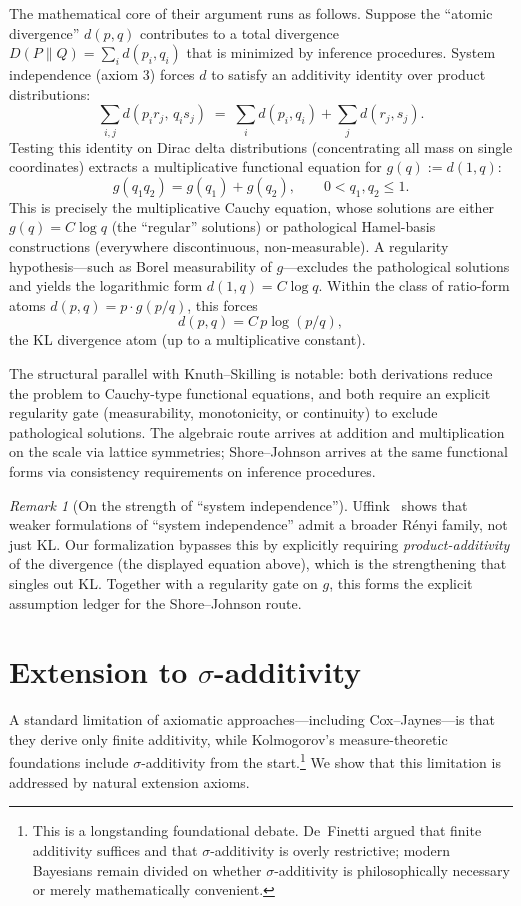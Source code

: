 \documentclass[11pt]{article}
\theoremstyle{definition}
\theoremstyle{remark}
\newtheorem{remark}[theorem]{Remark}
\begin{document}
The mathematical core of their argument runs as follows.  Suppose the ``atomic divergence''
$d(p,q)$ contributes to a total divergence $D(P\|Q)=\sum_i d(p_i,q_i)$ that is minimized by
inference procedures.  System independence (axiom 3) forces $d$ to satisfy an additivity identity
over product distributions:
\[
  \sum_{i,j} d(p_i r_j,\, q_i s_j) \;=\; \sum_i d(p_i,q_i) + \sum_j d(r_j,s_j).
\]
Testing this identity on Dirac delta distributions (concentrating all mass on single coordinates)
extracts a multiplicative functional equation for $g(q) := d(1,q)$:
\[
  g(q_1 q_2) = g(q_1) + g(q_2), \qquad 0 < q_1,q_2 \le 1.
\]
This is precisely the multiplicative Cauchy equation, whose solutions are either $g(q)=C\log q$
(the ``regular'' solutions) or pathological Hamel-basis constructions (everywhere discontinuous,
non-measurable).  A regularity hypothesis---such as Borel measurability of $g$---excludes the
pathological solutions and yields the logarithmic form $d(1,q)=C\log q$.  Within the class of
ratio-form atoms $d(p,q)=p\cdot g(p/q)$, this forces
\[
  d(p,q) = C\, p\log(p/q),
\]
the KL divergence atom (up to a multiplicative constant).

The structural parallel with Knuth--Skilling is notable: both derivations reduce the problem to
Cauchy-type functional equations, and both require an explicit regularity gate (measurability,
monotonicity, or continuity) to exclude pathological solutions.  The algebraic route arrives at
addition and multiplication on the scale via lattice symmetries; Shore--Johnson arrives at the
same functional forms via consistency requirements on inference procedures.

\begin{remark}[On the strength of ``system independence'']
Uffink~\cite{Uffink1995} shows that weaker formulations of ``system independence'' admit a broader
R\'enyi family, not just KL.  Our formalization bypasses this by explicitly requiring
\emph{product-additivity} of the divergence (the displayed equation above), which is the
strengthening that singles out KL.  Together with a regularity gate on $g$, this forms the
explicit assumption ledger for the Shore--Johnson route.
\end{remark}

\section{Extension to $\sigma$-additivity}
\label{sec:sigma-extension}

A standard limitation of axiomatic approaches---including Cox--Jaynes---is that they derive
only finite additivity, while Kolmogorov's measure-theoretic foundations include $\sigma$-additivity
from the start.\footnote{This is a longstanding foundational debate.  De~Finetti \cite{deFinetti1974}
argued that finite additivity suffices and that $\sigma$-additivity is overly restrictive;
modern Bayesians remain divided on whether $\sigma$-additivity is philosophically necessary
or merely mathematically convenient.}
We show that this limitation is addressed by natural extension axioms.
\end{document}
